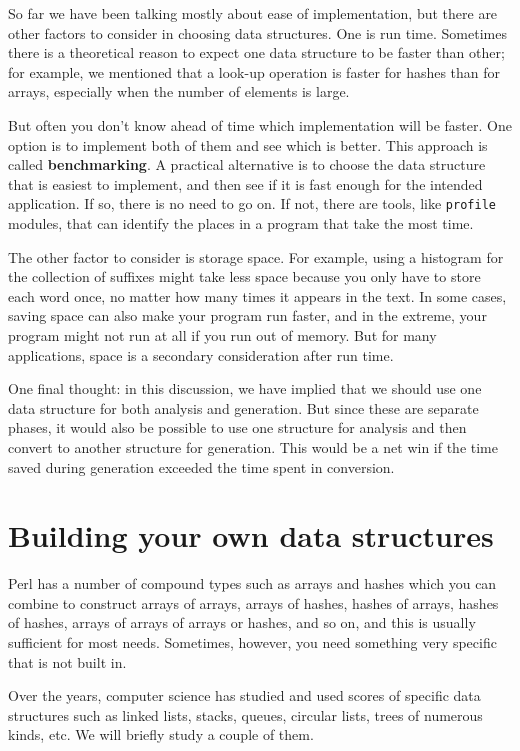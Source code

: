 So far we have been talking mostly about ease of implementation,
but there are other factors to consider in choosing data structures.
One is run time.  Sometimes there is a theoretical reason to expect
one data structure to be faster than other; for example, we mentioned
that a look-up operation is faster for hashes than for arrays,
especially when the number of elements is large.

But often you don't know ahead of time which implementation will
be faster.  One option is to implement both of them and see which
is better.  This approach is called {\bf benchmarking}.  A practical
alternative is to choose the data structure that is
easiest to implement, and then see if it is fast enough for the
intended application.  If so, there is no need to go on.  If not,
there are tools, like {\tt profile} modules, that can identify
the places in a program that take the most time.

The other factor to consider is storage space.  For example, using a
histogram for the collection of suffixes might take less space because
you only have to store each word once, no matter how many times it
appears in the text.  In some cases, saving space can also make your
program run faster, and in the extreme, your program might not run at
all if you run out of memory.  But for many applications, space is a
secondary consideration after run time.

One final thought: in this discussion, we have implied that
we should use one data structure for both analysis and generation.  But
since these are separate phases, it would also be possible to use one
structure for analysis and then convert to another structure for
generation.  This would be a net win if the time saved during
generation exceeded the time spent in conversion.

\section{Building your own data structures}

Perl has a number of compound types such as arrays and hashes 
which you can combine to construct arrays of arrays, arrays of 
hashes, hashes of arrays, hashes of hashes, arrays of arrays of 
arrays or hashes, and so on, and this is usually sufficient for 
most needs. Sometimes, however, you need something very specific 
that is not built in.

Over the years, computer science has studied and used scores of 
specific data structures such as linked lists, stacks, queues, 
circular lists, trees of numerous kinds, etc. We will briefly 
study a couple of them.

